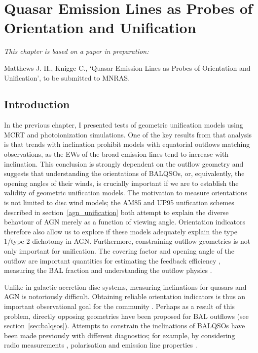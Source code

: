 \chapter{Quasar Emission Lines as Probes of Orientation and Unification}



{\em This chapter is based on a paper in preparation:

Matthews J. H., Knigge C., 
`Quasar Emission Lines as Probes of Orientation and Unification',
to be submitted to MNRAS.}


%
%
\maketitle

\section{Introduction}

In the previous chapter, I presented tests of geometric unification
models using MCRT and photoionization simulations. 
One of the key results from that analysis is that trends with
inclination prohibit models with equatorial outflows matching
observations, as the EWs of the broad emission lines tend
to increase with inclination. This conclusion is strongly dependent 
on the outflow geometry and suggests that understanding the orientations
of BALQSOs, or, equivalently, the opening angles of their winds, is crucially
important if we are to establish the validity of geometric unification
models. The motivation to measure orientations is not limited to disc wind models; the
AM85 and UP95 unification schemes described in section~\ref{agn_unification}
both attempt to explain the diverse behaviour of AGN merely as a function of viewing 
angle. Orientation indicators therefore also allow us to explore if these models
adequately explain the type 1/type 2 dichotomy in AGN.
Furthermore, constraining outflow geometries is not only important 
for unification. The covering factor and opening angle of the outflow
are important quantities for estimating the
feedback efficiency \citep[e.g.][]{borguet2012}, measuring
the BAL fraction \citep[e.g.][]{krolikvoit1998}
and understanding the outflow physics \citep[e.g.][]{proga2005}. 

Unlike in galactic accretion disc systems, measuring inclinations
for quasars and AGN is notoriously difficult. Obtaining 
reliable orientation indicators is thus an important observational
goal for the community \citep[see e.g.][]{marin2016}. 
Perhaps as a result of this problem, 
directly opposing geometries have been proposed for 
BAL outflows (see section~\ref{sec:balqsos}). 
Attempts to constrain the inclinations
of BALQSOs have been made previously with
different diagnostics; for example, by considering 
radio measurements \citep{zhou2006,dipompeo2012a}, 
polarisation \citep{brotherton2006}
and emission line properties \citep{dipompeo2012b}.  

